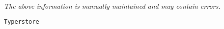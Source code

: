 \label{pkg:typerstore}

{\tiny \it The above information is manually maintained and may contain errors.}
\begin{verbatim}
Typerstore
\end{verbatim}
